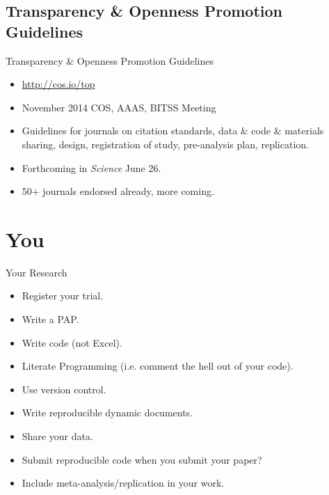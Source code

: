 \documentclass{beamer}
\begin{document}
\subsection{Transparency \& Openness Promotion Guidelines}
\begin{frame}{Transparency \& Openness Promotion Guidelines}
\begin{itemize}
\item \url{http://cos.io/top}
\item November 2014 COS, AAAS, BITSS Meeting

\item Guidelines for journals on citation standards, data \& code \& materials sharing, design, registration of study, pre-analysis plan, replication.

\item Forthcoming in \textit{Science} June 26. 

\item 50+ journals endorsed already, more coming.
\end{itemize} 
\end{frame}
\section{You}
\begin{frame}{Your Research}
\begin{itemize}
\item Register your trial.
\item Write a PAP.
\item Write code (not Excel).
\item Literate Programming (i.e. comment the hell out of your code).
\item Use version control.
\item Write reproducible dynamic documents.
\item Share your data.
\item Submit reproducible code when you submit your paper?
\item Include meta-analysis/replication in your work.
\end{itemize}
\end{frame}
\end{document}
